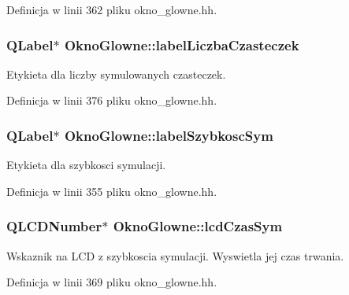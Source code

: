 Definicja w linii 362 pliku okno\+\_\+glowne.\+hh.

\hypertarget{class_okno_glowne_ab01460f1222d0ec2892abf21efb23078}{}
\subsubsection[{label\+Liczba\+Czasteczek}]{\setlength{\rightskip}{0pt plus 5cm}Q\+Label$\ast$ Okno\+Glowne\+::label\+Liczba\+Czasteczek\hspace{0.3cm}{\ttfamily [private]}}\label{class_okno_glowne_ab01460f1222d0ec2892abf21efb23078}
Etykieta dla liczby symulowanych czasteczek. 

Definicja w linii 376 pliku okno\+\_\+glowne.\+hh.

\hypertarget{class_okno_glowne_ad7b0708ffdf61f3bef1349cc353a6c4e}{}
\subsubsection[{label\+Szybkosc\+Sym}]{\setlength{\rightskip}{0pt plus 5cm}Q\+Label$\ast$ Okno\+Glowne\+::label\+Szybkosc\+Sym\hspace{0.3cm}{\ttfamily [private]}}\label{class_okno_glowne_ad7b0708ffdf61f3bef1349cc353a6c4e}
Etykieta dla szybkosci symulacji. 

Definicja w linii 355 pliku okno\+\_\+glowne.\+hh.

\hypertarget{class_okno_glowne_ab34fefe738e38b1b0d4ce764481cc0c6}{}
\subsubsection[{lcd\+Czas\+Sym}]{\setlength{\rightskip}{0pt plus 5cm}Q\+L\+C\+D\+Number$\ast$ Okno\+Glowne\+::lcd\+Czas\+Sym\hspace{0.3cm}{\ttfamily [private]}}\label{class_okno_glowne_ab34fefe738e38b1b0d4ce764481cc0c6}
Wskaznik na L\+C\+D z szybkoscia symulacji. Wyswietla jej czas trwania. 

Definicja w linii 369 pliku okno\+\_\+glowne.\+hh.

\hypertarget{class_okno_glowne_adbdd9fc009725804e015d267dc8375dc}{}
